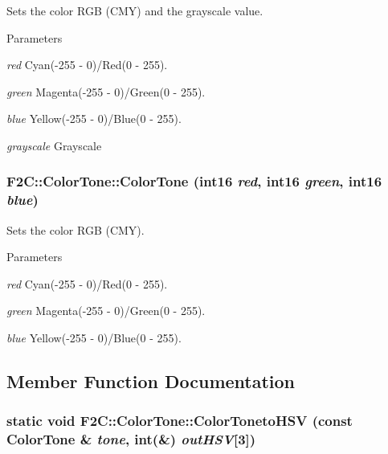 Sets the color RGB (CMY) and the grayscale value. 
\begin{DoxyParams}{Parameters}
\item[{\em red}]Cyan(-\/255 -\/ 0)/Red(0 -\/ 255). \item[{\em green}]Magenta(-\/255 -\/ 0)/Green(0 -\/ 255). \item[{\em blue}]Yellow(-\/255 -\/ 0)/Blue(0 -\/ 255). \item[{\em grayscale}]Grayscale \end{DoxyParams}
\hypertarget{class_f2_c_1_1_color_tone_a8e73eb2e9c80a299ab7d1f935d33d613}{
\subsubsection[{ColorTone}]{\setlength{\rightskip}{0pt plus 5cm}F2C::ColorTone::ColorTone ({\bf int16} {\em red}, \/  {\bf int16} {\em green}, \/  {\bf int16} {\em blue})}}
\label{class_f2_c_1_1_color_tone_a8e73eb2e9c80a299ab7d1f935d33d613}


Sets the color RGB (CMY). 
\begin{DoxyParams}{Parameters}
\item[{\em red}]Cyan(-\/255 -\/ 0)/Red(0 -\/ 255). \item[{\em green}]Magenta(-\/255 -\/ 0)/Green(0 -\/ 255). \item[{\em blue}]Yellow(-\/255 -\/ 0)/Blue(0 -\/ 255). \end{DoxyParams}


\subsection{Member Function Documentation}
\hypertarget{class_f2_c_1_1_color_tone_a888395ee1133ec4e44683d571f719ab0}{
\subsubsection[{ColorTonetoHSV}]{\setlength{\rightskip}{0pt plus 5cm}static void F2C::ColorTone::ColorTonetoHSV (const {\bf ColorTone} \& {\em tone}, \/  int(\&) {\em outHSV}\mbox{[}3\mbox{]})}}
\label{class_f2_c_1_1_color_tone_a888395ee1133ec4e44683d571f719ab0}


